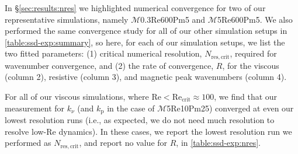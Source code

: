 \documentclass[12pt,twoside]{extreport}
\newcommand{\mReh}{\ensuremath{\mathrm{Re}}} %
\newcommand{\mPrm}{\ensuremath{\mathrm{Pm}}} %
\newcommand{\mSonicMach}{\ensuremath{\mathcal{M}}} %
\newcommand{\ie}{i.e.,\xspace} %
\newcommand{\SimName}[3]{$\mSonicMach${#1}$\mReh${#2}$\mPrm${#3}}
\begin{document}
In \S\ref{sec:results:nres} we highlighted numerical convergence for two of our representative simulations, namely \SimName{0.3}{600}{5} and \SimName{5}{600}{5}. We also performed the same convergence study for all of our other simulation setups in \autoref{table:ssd-exp:summary}, so here, for each of our simulation setups, we list the two fitted parameters: (1) critical numerical resolution, $N_{\mathrm{res}, \mathrm{crit}}$, required for wavenumber convergence, and (2) the rate of convergence, $R$, for the viscous (column 2), resistive (column 3), and magnetic peak wavenumbers (column 4).

For all of our viscous simulations, where $\mReh < \mReh_\mathrm{crit} \approx 100$, we find that our measurement for $k_\nu$ (and $k_\mathrm{p}$ in the case of \SimName{5}{10}{25}) converged at even our lowest resolution runs (\ie as expected, we do not need much resolution to resolve low-$\mReh$ dynamics). In these cases, we report the lowest resolution run we performed as $N_{\mathrm{res}, \mathrm{crit}}$, and report no value for $R$, in \autoref{table:ssd-exp:nres}.
\end{document}
